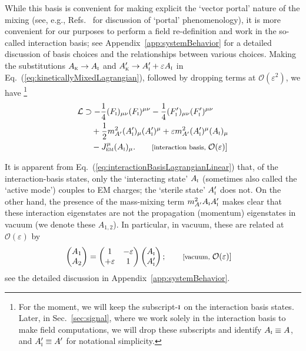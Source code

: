 \documentclass[amsmath,amssymb,aps,10pt,prd,letterpaper,nofootinbib,balancelastpage,notitlepage,superscriptaddress,twocolumn,floatfix]{revtex4-2}
\newcommand{\secref}[2][]{Sec{#1}.~\ref{#2}}		%
\newcommand{\appref}[2][x]{Appendi{#1}~\ref{#2}}	%
\renewcommand{\eqref}[2][]{Eq{#1}.~(\ref{eq:#2})}	%
\newcommand{\citeR}[2][]{Ref{#1}.~\cite{#2}}		%
\newcommand{\nl}{\nonumber \\ & \quad }					%
\newcommand{\tsc}[1]{\textsc{#1}}
\newcommand{\LL}{\mathcal{L}}
\newcommand{\inter}[1]{({#1}_{\textsc{i}})}
\newcommand{\primeinter}[1]{({#1}_{\textsc{i}}^\prime)}
\begin{document}
While this basis is convenient for making explicit the `vector portal' nature of the mixing (see, e.g., \citeR[s]{graham2016dark,safronova2018search} for discussion of `portal' phenomenology), it is more convenient for our purposes to perform a field re-definition and work in the so-called interaction basis; see \appref{app:systemBehavior} for a detailed discussion of basis choices and the relationships between various choices.
Making the substitutions $A_{\tsc{k}} \rightarrow A_{\tsc{i}}$ and $A'_{\tsc{k}} \rightarrow A'_{\tsc{i}} + \varepsilon A_{\tsc{i}}$ in \eqref{kineticallyMixedLagrangian}, followed by dropping terms at $\mathcal{O}(\varepsilon^2)$, we have%
\footnote{\label{ftnt:notationChange}%
    For the moment, we will keep the subscript-$\tsc{i}$ on the interaction basis states.
    Later, in \secref{sec:signal}, where we work solely in the interaction basis to make field computations, we will drop these subscripts and identify $A_{\tsc{i}}\equiv A$, and $A_{\tsc{i}}' \equiv A'$ for notational simplicity.
} %
\begin{align}
    \LL &\supset - \frac{1}{4} \inter{F}_{\mu\nu}\inter{F}^{\mu\nu} - \frac{1}{4} \primeinter{F}_{\mu\nu} \primeinter{F}^{\mu\nu}\nl
    + \frac{1}{2} m_{A'}^2 \primeinter{A}_\mu \primeinter{A}^{\mu} 
    + \varepsilon m_{A'}^2 \primeinter{A}^{\mu} \inter{A}_\mu \nl
    - J_{\textsc{em}}^\mu \inter{A}_\mu. \qquad \text{\footnotesize[interaction basis, } \mathcal{O}(\varepsilon)\text{]}
    \label{eq:interactionBasisLagrangianLinear}
\end{align}

It is apparent from \eqref{interactionBasisLagrangianLinear} that, of the interaction-basis states, only the `interacting state' $A_{\tsc{i}}$ (sometimes also called the `active mode') couples to EM charges; the `sterile state' $A'_{\tsc{i}}$ does not. 
On the other hand, the presence of the mass-mixing term $m_{A'}^2 A_{\tsc{i}}A_{\tsc{i}}'$ makes clear that these interaction eigenstates are not the propagation (momentum) eigenstates in vacuum (we denote these $A_{1,2}$).
In particular, in vacuum, these are related at $\mathcal{O}(\varepsilon)$ by
\begin{align}
    \begin{pmatrix} A_1 \\ A_2 \end{pmatrix}
    &= \begin{pmatrix}
            1 & -\varepsilon \\
            +\varepsilon & 1
        \end{pmatrix}
        \begin{pmatrix} A_{\textsc{i}} \\ A_{\textsc{i}}' \end{pmatrix};
   \qquad \text{\footnotesize[vacuum, } \mathcal{O}(\varepsilon)\text{]}
    \label{eq:vacuumPropagationRelation}
\end{align}
see the detailed discussion in \appref{app:systemBehavior}.
\end{document}
